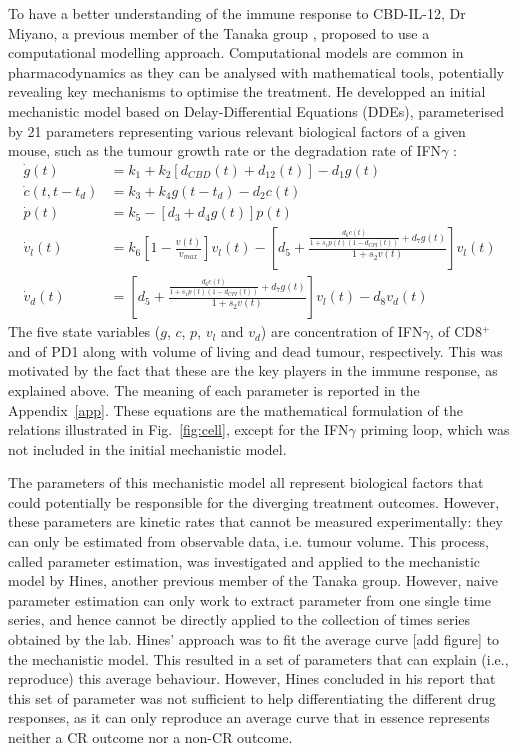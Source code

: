 \documentclass[11pt]{article}
\begin{document}
To have a better understanding of the immune response to CBD-IL-12, Dr Miyano, a previous member of the Tanaka group \cite{takuya}, proposed to use a computational modelling approach. Computational models are common in pharmacodynamics as they can be analysed with mathematical tools, potentially revealing key mechanisms to optimise the treatment. He developped an initial mechanistic model based on Delay-Differential Equations (DDEs), parameterised by 21 parameters representing various relevant biological factors of a given mouse, such as the tumour growth rate or the degradation rate of IFN$\gamma$ \cite{takuya}: 
\begin{align*}
    \dot{g}(t) &= k_1 + k_2 [d_{CBD}(t) + d_{12}(t)] - d_1g(t) \\ 
    \dot{c}(t,t-t_d) &= k_3 + k_4g(t-t_d)-d_2c(t) \\ 
    \dot{p}(t) &= k_5 - [d_3 + d_4g(t)]p(t) \\ 
    \dot{v}_l(t) &= k_6\left[1 - \frac{v(t)}{v_{max}} \right]v_l(t) - \left[d_5 + \frac{\frac{d_6c(t)}{1+s_1p(t)(1-d_{CPI}(t))}+d_7g(t)}{1+s_2v(t)}\right]v_l(t)\\
    \dot{v}_d(t) &= \left[d_5 + \frac{\frac{d_6c(t)}{1+s_1p(t)(1-d_{CPI}(t))}+d_7g(t)}{1+s_2v(t)}\right]v_l(t) - d_8 v_d(t)
\end{align*}
The five state variables ($g$, $c$, $p$, $v_l$ and $v_d$) are concentration of IFN$\gamma$, of CD8$^+$ and of PD1 along with volume of living and dead tumour, respectively. This was motivated by the fact that these are the key players in the immune response, as explained above. The meaning of each parameter is reported in the Appendix~\ref{app}. These equations are the mathematical formulation of the relations illustrated in Fig.~\ref{fig:cell}, except for the IFN$\gamma$ priming loop, which was not included in the initial mechanistic model.

The parameters of this mechanistic model all represent biological factors that could potentially be responsible for the diverging treatment outcomes. However, these parameters are kinetic rates that cannot be measured experimentally: they can only be estimated from observable data, i.e. tumour volume. This process, called parameter estimation, was investigated and applied to the mechanistic model by Hines, another previous member of the Tanaka group. However, naive parameter estimation can only work to extract parameter from one single time series, and hence cannot be directly applied to the collection of times series obtained by the lab. Hines' approach was to fit the average curve [add figure] to the mechanistic model. This resulted in a set of parameters that can explain (i.e., reproduce) this average behaviour. However, Hines concluded in his report that this set of parameter was not sufficient to help differentiating the different drug responses, as it can only reproduce an average curve that in essence represents neither a CR outcome nor a non-CR outcome.
\end{document}
